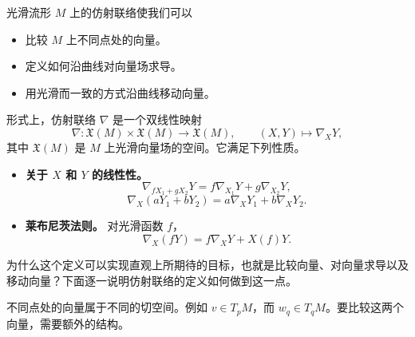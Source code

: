 光滑流形 $M$ 上的仿射联络使我们可以
\begin{itemize}
\item 比较 $M$ 上不同点处的向量。
\item 定义如何沿曲线对向量场求导。
\item 用光滑而一致的方式沿曲线移动向量。
\end{itemize}
形式上，仿射联络 $\nabla$ 是一个双线性映射
\begin{equation*}
  \nabla\colon\mathfrak X(M)\times\mathfrak X(M)\to\mathfrak X(M),
  \qquad (X,Y)\mapsto\nabla_XY,
  \tag{6A9}\label{eq:6A9}
\end{equation*}
其中 $\mathfrak X(M)$ 是 $M$ 上光滑向量场的空间。它满足下列性质。
\begin{itemize}
\item \textbf{关于 $X$ 和 $Y$ 的线性性。}
\begin{equation*}
  \nabla_{fX_1+gX_2}Y=f\nabla_{X_1}Y+g\nabla_{X_2}Y,
  \tag{6A10}\label{eq:6A10}
\end{equation*}
\begin{equation*}
  \nabla_X(aY_1+bY_2)=a\nabla_XY_1+b\nabla_XY_2.
  \tag{6A11}\label{eq:6A11}
\end{equation*}
\item \textbf{莱布尼茨法则。} 对光滑函数 $f$，
\begin{equation*}
  \nabla_X(fY)=f\nabla_XY+X(f)Y.
  \tag{6A12}\label{eq:6A12}
\end{equation*}
\end{itemize}

为什么这个定义可以实现直观上所期待的目标，也就是比较向量、对向量求导以及移动向量？下面逐一说明仿射联络的定义如何做到这一点。

不同点处的向量属于不同的切空间。例如 $v\in T_pM$，而 $w_q\in T_qM$。要比较这两个向量，需要额外的结构。

